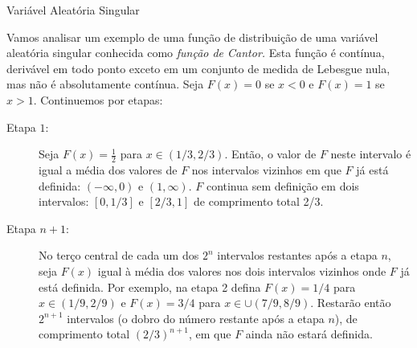 %
\begin{frame}
\begin{block}{Variável Aleatória Singular}

Vamos analisar um exemplo de uma função de distribuição de uma variável aleatória singular conhecida como {\em função de Cantor.} Esta função é contínua, derivável em todo ponto exceto em um conjunto de medida de Lebesgue nula, mas não é absolutamente contínua. Seja $F(x)=0$ se $x<0$ e $F(x)=1$ se $x>1$. Continuemos por etapas:

\begin{description}
\item[Etapa $1$:] Seja $F(x)=\frac{1}{2}$ para $x\in(1/3,2/3)$. Então, o valor de $F$ neste intervalo é igual a média dos valores de $F$ nos intervalos vizinhos em que $F$ já está definida: $(-\infty,0)$ e $(1,\infty)$. $F$ continua sem definição em dois intervalos: $[0,1/3]$ e $[2/3,1]$ de comprimento total 2/3.\\

\item[Etapa $n+1$:] No terço central de cada um dos $2^n$ intervalos restantes após a etapa $n$, seja $F(x)$ igual à média dos valores nos dois intervalos vizinhos onde $F$ já está definida. Por exemplo, na etapa 2 defina $F(x)=1/4$ para $x\in(1/9,2/9)$ e $F(x)=3/4$ para $x\in\cup(7/9,8/9)$. Restarão então $2^{n+1}$ intervalos (o dobro do número restante após a etapa $n$), de comprimento total $(2/3)^{n+1}$, em que $F$ ainda não estará definida.
\end{description}

\end{block}
\end{frame}
%
